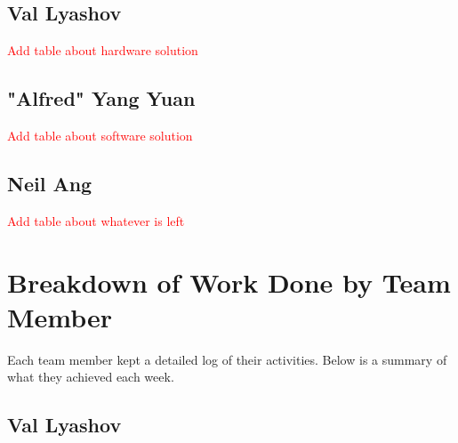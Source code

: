 \documentclass[11pt,a4paper,titlepage]{report}
\begin{document}
\subsection{Val Lyashov}

\textcolor{red}{Add table about hardware solution}

\subsection{"Alfred" Yang Yuan}

\textcolor{red}{Add table about software solution}

\subsection{Neil Ang}

\textcolor{red}{Add table about whatever is left}


\section{Breakdown of Work Done by Team Member}

Each team member kept a detailed log of their activities. Below is a summary of what they achieved each week.

\subsection{Val Lyashov}
\end{document}
